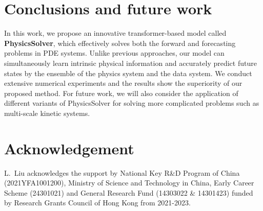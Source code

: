 \documentclass[preprint,11pt]{elsarticle}
\begin{document}
\section{Conclusions and future work}
In this work, we propose an innovative transformer-based model called \textbf{PhysicsSolver}, which effectively solves both the forward and forecasting problems in PDE systems. Unlike previous approaches, our model can simultaneously learn intrinsic physical information and accurately predict future states by the ensemble of the physics system and the data system. We conduct extensive numerical experiments and the results show the superiority of our proposed method. For future work, we will also consider the application of different variants of PhysicsSolver for solving more complicated problems such as multi-scale kinetic systems. 



\section*{Acknowledgement}
\label{sec:ack}
L.~Liu acknowledges the support by National Key R\&D Program of China (2021YFA1001200), Ministry of Science and Technology in China, Early Career Scheme (24301021) and General Research Fund (14303022 \& 14301423) funded by Research Grants Council of Hong Kong from 2021-2023. 








\end{document}

